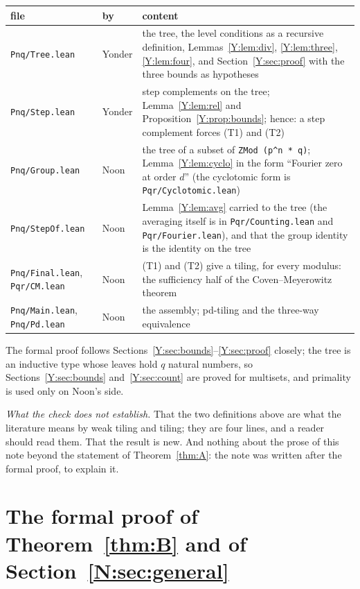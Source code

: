 \documentclass[11pt,a4paper]{amsart}
\theoremstyle{definition}
\theoremstyle{remark}
\newcommand{\lean}[1]{\texttt{#1}}
\begin{document}
\smallskip
\begin{center}\footnotesize
\begin{tabular}{llp{}}
file & by & content\\\hline
\lean{Pnq/Tree.lean} & Yonder & the tree, the level conditions as a recursive definition, Lemmas~\ref{Y:lem:div},
\ref{Y:lem:three}, \ref{Y:lem:four}, and Section~\ref{Y:sec:proof} with the three bounds as hypotheses\\
\lean{Pnq/Step.lean} & Yonder & step complements on the tree; Lemma~\ref{Y:lem:rel} and
Proposition~\ref{Y:prop:bounds}; hence: a step complement forces (T1) and (T2)\\
\lean{Pnq/Group.lean} & Noon & the tree of a subset of \lean{ZMod (p\^{}n * q)}; Lemma~\ref{Y:lem:cyclo} in the form
``Fourier zero at order $d$'' (the cyclotomic form is \lean{Pqr/Cyclotomic.lean})\\
\lean{Pnq/StepOf.lean} & Noon & Lemma~\ref{Y:lem:avg} carried to the tree (the averaging itself is in
\lean{Pqr/Counting.lean} and \lean{Pqr/Fourier.lean}), and that the group identity is the identity on the tree\\
\lean{Pnq/Final.lean}, \lean{Pqr/CM.lean} & Noon & (T1) and (T2) give a tiling, for every modulus: the
sufficiency half of the Coven--Meyerowitz theorem\\
\lean{Pnq/Main.lean}, \lean{Pnq/Pd.lean} & Noon & the assembly; pd-tiling and the three-way equivalence\\
\end{tabular}
\end{center}
\smallskip

The formal proof follows Sections~\ref{Y:sec:bounds}--\ref{Y:sec:proof} closely; the tree is an inductive type
whose leaves hold $q$ natural numbers, so Sections~\ref{Y:sec:bounds} and~\ref{Y:sec:count} are proved for
multisets, and primality is used only on Noon's side.

\emph{What the check does not establish.} That the two definitions above are what the literature means by
weak tiling and tiling; they are four lines, and a reader should read them. That the result is new. And
nothing about the prose of this note beyond the statement of Theorem~\ref{thm:A}: the note was written
after the formal proof, to explain it.

\section{The formal proof of Theorem~\ref{thm:B} and of Section~\ref{N:sec:general}}\label{N:sec:lean}
\end{document}
